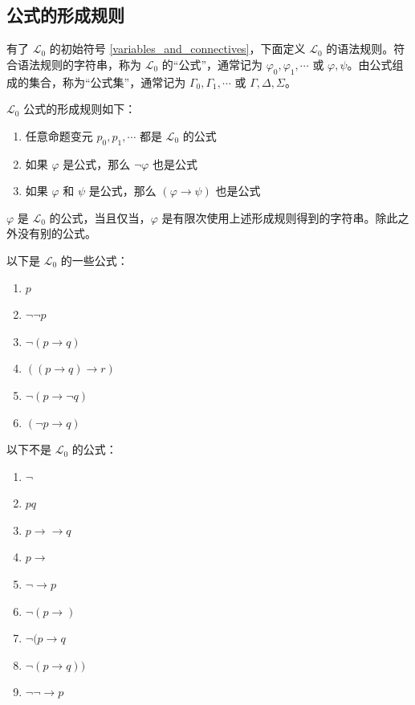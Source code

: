 \subsection{公式的形成规则}
\label{formation_rules}

有了 $\mathcal{L}_0$ 的初始符号 \ref{variables_and_connectives}，下面定义 $\mathcal{L}_0$ 的语法规则。符合语法规则的字符串，称为 $\mathcal{L}_0$ 的“公式”，通常记为 $\varphi_0,\varphi_1,\cdots$ 或 $\varphi,\psi$。由公式组成的集合，称为“公式集”，通常记为 $\Gamma_0,\Gamma_1,\cdots$ 或 $\Gamma,\Delta,\Sigma$。

\begin{definition}[命题逻辑公式形成规则]
    \label{formation_rules_of_L0}
    $\mathcal{L}_0$ 公式的形成规则如下：
    \begin{enumerate}
        \item 任意命题变元 $p_0,p_1,\cdots$ 都是 $\mathcal{L}_0$ 的公式
        \item 如果 $\varphi$ 是公式，那么 $\neg \varphi$ 也是公式
        \item 如果 $\varphi$ 和 $\psi$ 是公式，那么 $(\varphi \to \psi)$ 也是公式
    \end{enumerate}
\end{definition}

\begin{definition}
    \label{formula_of_L0}
    $\varphi$ 是 $\mathcal{L}_0$ 的公式，当且仅当，$\varphi$ 是有限次使用上述形成规则得到的字符串。除此之外没有别的公式。
\end{definition}

\begin{example}
    以下是 $\mathcal{L}_0$ 的一些公式：
    \begin{enumerate}
        \item $p$
        \item $\neg\neg p$
        \item $\neg (p \to q)$
        \item $((p \to q) \to r)$
        \item $\neg (p \to \neg q)$
        \item $(\neg p \to q)$
    \end{enumerate}
\end{example}

\begin{example}
    以下不是 $\mathcal{L}_0$ 的公式：
    \begin{enumerate}
        \item $\neg$
        \item $pq$
        \item $p\to\to q$
        \item $p \to$
        \item $\neg \to p$
        \item $\neg (p \to)$
        \item $\neg (p \to q$
        \item $\neg (p \to q))$
        \item $\neg \neg \to p$
    \end{enumerate}
\end{example}
